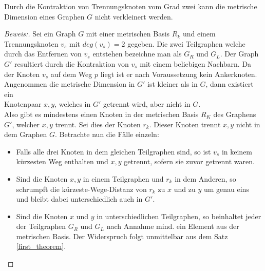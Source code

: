 \begin{lem}
\label{sepvertex2}
Durch die Kontraktion von Trennungsknoten vom Grad zwei kann die metrische Dimension eines Graphen $G$ nicht verkleinert werden.
\end{lem}
\begin{proof}[Beweis:]
Sei ein Graph $G$ mit einer metrischen Basis $R_k$ und einem Trennungsknoten $v_s$ mit $deg(v_s)=2$ gegeben. Die zwei Teilgraphen welche durch das Entfernen von $v_s$ entstehen bezeichne man als $G_R$ und $G_L$.
Der Graph $G'$ resultiert durch die Kontraktion von $v_s$ mit einem beliebigen Nachbarn. Da der Knoten $v_s$ auf dem Weg $p$ liegt ist er nach Voraussetzung kein Ankerknoten.\newline
Angenommen die metrische Dimension in $G'$ ist kleiner als in $G$, dann existiert ein\\Knotenpaar $x,y$, welches in $G'$ getrennt wird, aber nicht in $G$.\\Also gibt es mindestens einen Knoten in der metrischen Basis $R_K$ des Graphens $G'$, welcher $x,y$ trennt. Sei dies der Knoten $r_k$. Dieser Knoten trennt $x,y$ nicht in dem Graphen $G$. 
Betrachte nun die Fälle einzeln:
\begin{itemize}
\item Falls alle drei Knoten in dem gleichen Teilgraphen sind, so ist $v_s$ in keinem kürzesten Weg enthalten und $x,y$ getrennt, sofern sie zuvor getrennt waren.
\item Sind die Knoten $x,y$ in einem Teilgraphen und $r_k$ in dem Anderen, so schrumpft die kürzeste-Wege-Distanz von $r_k$ zu $x$ und zu $y$ um genau eins und bleibt dabei unterschiedlich auch in $G'$.
\item Sind die Knoten $x$ und $y$ in unterschiedlichen Teilgraphen, so beinhaltet jeder der Teilgraphen $G_R$ und $G_L$ nach Annahme mind. ein Element aus der metrischen Basis. Der Widerspruch folgt unmittelbar aus dem Satz \ref{first_theorem}.
\vspace{-5mm}
\end{itemize}
\end{proof}
